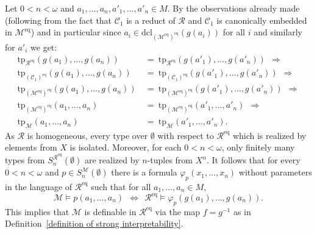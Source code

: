 \documentclass[11pt, twoside]{amsart}
\numberwithin{equation}{section}
\newcommand{\tp}{\mathrm{tp}}
\newcommand{\dcl}{\mathrm{dcl}}
\newcommand{\es}{\emptyset}
\newcommand{\meq}{^{\mathrm{eq}}}
\newcommand{\mcC}{\mathcal{C}}
\newcommand{\mcM}{\mathcal{M}}
\newcommand{\mcR}{\mathcal{R}}
\begin{document}
Let $0 < n < \omega$ and $a_1, \ldots, a_n, a'_1, \ldots, a'_n \in M$.
By the observations already made (following from the fact that $\mcC_1$ is a reduct of $\mcR$ and $\mcC_1$ is
canonically embedded in $\mcM\meq$) and in particular since
 $a_i \in \dcl_{(\mcM\meq)\meq}(g(a_i))$ for all $i$ and similarly for $a'_i$
we get:
\begin{align*}
\tp_{\mcR\meq}(g(a_1), \ldots, g(a_n)) \ &= \ \tp_{\mcR\meq}(g(a'_1), \ldots, g(a'_n)) \ \ \Longrightarrow \\
\tp_{(\mcC_1)\meq}(g(a_1), \ldots, g(a_n)) \ &= \ \tp_{(\mcC_1)\meq}(g(a'_1), \ldots, g(a'_n)) \ \ \Longrightarrow \\
\tp_{(\mcM\meq)\meq}(g(a_1), \ldots, g(a_n)) \ &= \ \tp_{(\mcM\meq)\meq}(g(a'_1), \ldots, g(a'_n)) \ \ \Longrightarrow \\
\tp_{(\mcM\meq)\meq}(a_1, \ldots, a_n) \ &= \ \tp_{(\mcM\meq)\meq}(a'_1, \ldots, a'_n) \ \ \Longrightarrow \\
\tp_\mcM(a_1, \ldots, a_n) \ &= \ \tp_\mcM(a'_1, \ldots, a'_n).
\end{align*}
As $\mcR$ is homogeneous, every type over $\es$ with respect to $\mcR\meq$ which is realized by elements from $X$ is isolated.
Moreover, for each $0 < n < \omega$, only finitely many types from $S^{\mcR\meq}_n(\es)$ are realized by $n$-tuples from $X^n$.
It follows that for every $0 < n < \omega$ and $p \in S^\mcM_n(\es)$ there is a formula $\varphi_p(x_1, \ldots, x_n)$ without parameters
in the language of $\mcR\meq$ such that for all $a_1, \ldots, a_n \in M$,
\[ \mcM \models p(a_1, \ldots, a_n) \ \ \Longleftrightarrow \ \ \mcR\meq \models \varphi_p(g(a_1), \ldots, g(a_n)). \]
This implies that $\mcM$ is definable in $\mcR\meq$ via the map $f = g^{-1}$ as in Definition~\ref{definition of strong interpretability}.
\end{document}

